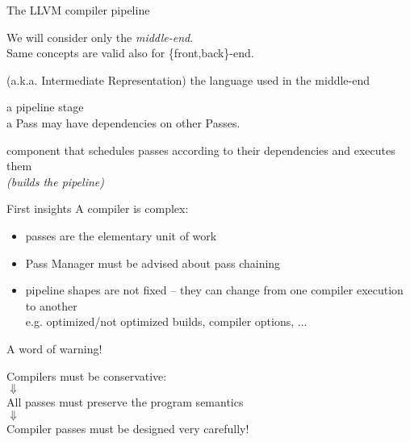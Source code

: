 \begin{frame}{The LLVM compiler pipeline}
\begin{center}
We will consider only the \emph{middle-end}.\\
{\small Same concepts are valid also for \{front,back\}-end.}\\
\bigskip
\begin{description}
\item[IR] (a.k.a. Intermediate Representation) the \alert{language} used in the
          middle-end
\item[Pass] a \alert{pipeline stage}\\
a Pass may have \alert{dependencies} on other Passes.
\item[Pass Manager] component that \alert{schedules} passes according to their \alert{dependencies} and \alert{executes} them\\
\emph{(builds the pipeline)}
\end{description}
\end{center}
\end{frame}


\begin{frame}{First insights}
A compiler is \alert{complex}:

\begin{itemize}
\item passes are the \alert{elementary unit of work}
\item Pass Manager must be \alert{advised} about pass chaining
\item pipeline shapes are \alert{not fixed} -- they can change from one compiler
      execution to another\\
      {\small e.g. optimized/not optimized builds, compiler options, ...}
\end{itemize}
\end{frame}


\begin{frame}{A word of warning!}
\begin{center}
{\large 
Compilers must be \alert{conservative}:\\
\smallskip
$\Downarrow$\\
\smallskip
All passes \alert{must preserve the program semantics}\\
\smallskip
$\Downarrow$\\
\smallskip
Compiler passes must be designed \alert{very carefully}!\\
}
\end{center}
\end{frame}
